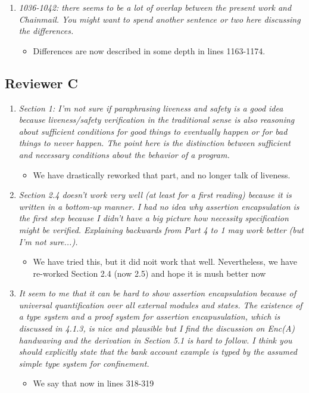 \documentclass[11pt]{amsart}
\begin{document}
\begin{enumerate}
\item
\emph{
1036-1042: there seems to be a lot of overlap between the present work and Chainmail. You might want to spend another sentence or two here discussing the differences.}
\begin{itemize}
\item  
Differences are now described in some depth in lines 1163-1174.
\end{itemize}

\end{enumerate}

\subsection{Reviewer C}
\begin{enumerate}
\item
\emph{
Section 1: I'm not sure if paraphrasing liveness and safety is a good idea because liveness/safety verification in the traditional sense is also reasoning about sufficient conditions for good things to eventually happen or for bad things to never happen. The point here is the distinction between sufficient and necessary conditions about the behavior of a program.}
\begin{itemize}
\item  
We have drastically reworked that part, and no longer talk of liveness.
\end{itemize}

\item
\emph{
Section 2.4 doesn't work very well (at least for a first reading) because it is written in a bottom-up manner. I had no idea why assertion encapsulation is the first step because I didn't have a big picture how necessity specification might be verified. Explaining backwards from Part 4 to 1 may work better (but I'm not sure...).}
\begin{itemize}
\item  
We have tried this, but it did noit work that well. Nevertheless, we have re-worked Section 2.4 (now 2.5) and hope it is mush better now
\end{itemize}

\item
\emph{
It seem to me that it can be hard to show assertion encapsulation because of universal quantification over all external modules and states. The existence of a type system and a proof system for assertion encapusulation, which is discussed in 4.1.3, is nice and plausible but I find the discussion on Enc(A) handwaving and the derivation in Section 5.1 is hard to follow. I think you should explicitly state that the bank account example is typed by the assumed simple type system for confinement.}
\begin{itemize}
\item  
We say that now in lines 318-319
\end{itemize}


\end{enumerate}
\end{document}
